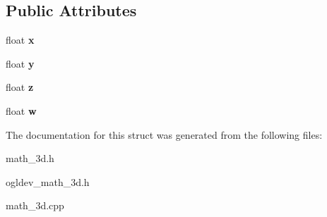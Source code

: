 \subsection*{Public Attributes}
\begin{DoxyCompactItemize}
\item 
\hypertarget{structQuaternion_a8b80f191a3155cc0158d2b4f4d50b2cb}{float {\bfseries x}}\label{structQuaternion_a8b80f191a3155cc0158d2b4f4d50b2cb}

\item 
\hypertarget{structQuaternion_a3bd3f270462944423611f44e19d2511b}{float {\bfseries y}}\label{structQuaternion_a3bd3f270462944423611f44e19d2511b}

\item 
\hypertarget{structQuaternion_a625cb732d8ff3083e7852b86b736ab29}{float {\bfseries z}}\label{structQuaternion_a625cb732d8ff3083e7852b86b736ab29}

\item 
\hypertarget{structQuaternion_aa44a65ab99e36f6ab8771030eed8a7ad}{float {\bfseries w}}\label{structQuaternion_aa44a65ab99e36f6ab8771030eed8a7ad}

\end{DoxyCompactItemize}


The documentation for this struct was generated from the following files\-:\begin{DoxyCompactItemize}
\item 
math\-\_\-3d.\-h\item 
ogldev\-\_\-math\-\_\-3d.\-h\item 
math\-\_\-3d.\-cpp\end{DoxyCompactItemize}
